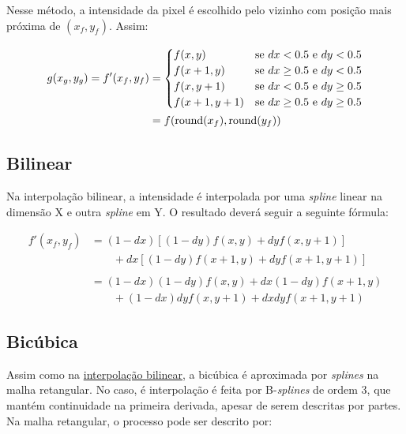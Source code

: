 Nesse método, a intensidade da pixel é escolhido pelo vizinho com posição mais próxima de $(x_f, y_f)$. Assim: %

\begin{align*}
    g(x_g, y_g) = f'(x_f, y_f) &= \begin{cases}
        f(x, y) & \text{se } dx < 0.5 \text{ e } dy < 0.5 \\
        f(x+1, y) & \text{se } dx \geq 0.5 \text{ e } dy < 0.5 \\
        f(x, y+1) & \text{se } dx < 0.5 \text{ e } dy \geq 0.5 \\
        f(x+1, y+1) & \text{se } dx \geq 0.5 \text{ e } dy \geq 0.5 \\
    \end{cases} \\
    &= f(\operatorname{round}(x_f), \operatorname{round}(y_f))
\end{align*}

\subsection{Bilinear} \label{sec:interp:bilinear}

Na interpolação bilinear, a intensidade é interpolada por uma \textit{spline} \autocite{spline} linear na dimensão X e outra \textit{spline} em Y. O resultado deverá seguir a seguinte fórmula:

\begin{align*}
    f'(x_f, y_f) &= (1-dx) \left[(1-dy) f(x,y) + dy f(x,y+1)\right] \\
        &\qquad + dx \left[(1-dy) f(x+1,y) + dy f(x+1,y+1)\right] \\
        \\
        &= (1-dx) (1-dy) f(x,y) + dx (1 - dy) f(x+1,y) \\
        &\qquad + (1-dx) dy f(x,y+1) + dx dy f(x+1,y+1)
\end{align*}

\subsection{Bicúbica} \label{sec:interp:bicubica}

Assim como na \hyperref[sec:interp:bilinear]{interpolação bilinear}, a bicúbica é aproximada por \textit{splines} na malha retangular. No caso, é interpolação é feita por B-\textit{splines} de ordem 3, que mantém continuidade na primeira derivada, apesar de serem descritas por partes. Na malha retangular, o processo pode ser descrito por:

